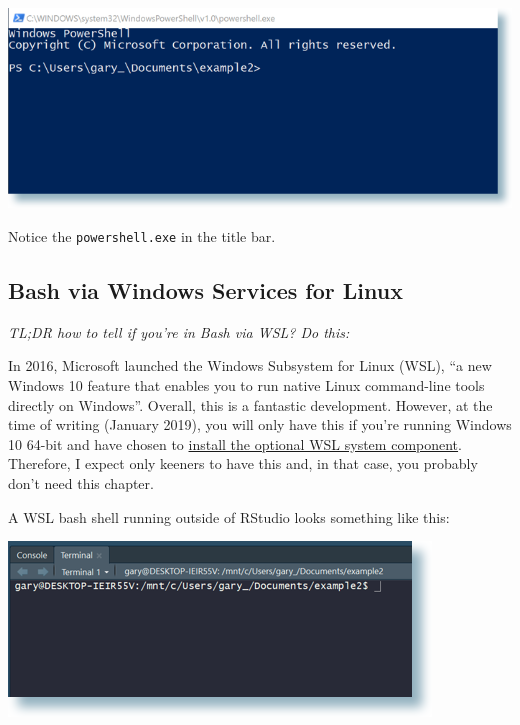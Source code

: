 \documentclass[
]{book}
\newenvironment{Shaded}{\begin{snugshade}}{\end{snugshade}}
\newcommand{\ExtensionTok}[1]{#1}
\newcommand{\NormalTok}[1]{#1}
\newcommand{\VariableTok}[1]{\textcolor[rgb]{0.00,0.00,0.00}{#1}}
\begin{document}
\includegraphics{img/2018-01-15_power-shell.png}

Notice the \texttt{powershell.exe} in the title bar.

\subsection{Bash via Windows Services for Linux}\label{bash-via-windows-services-for-linux}

\emph{TL;DR how to tell if you're in Bash via WSL? Do this:}

\begin{Shaded}
\end{Shaded}

In 2016, Microsoft launched the Windows Subsystem for Linux (WSL), ``a new Windows 10 feature that enables you to run native Linux command-line tools directly on Windows''. Overall, this is a fantastic development. However, at the time of writing (January 2019), you will only have this if you're running Windows 10 64-bit and have chosen to \href{https://docs.microsoft.com/en-us/windows/wsl/install-win10}{install the optional WSL system component}. Therefore, I expect only keeners to have this and, in that case, you probably don't need this chapter.

A WSL bash shell running outside of RStudio looks something like this:

\includegraphics{img/2018-01-15_bash-windows-services-for-linux.png}
\end{document}
